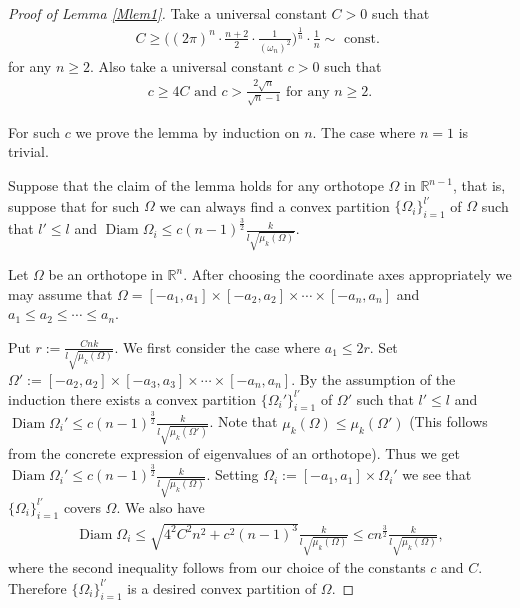 \documentclass[12pt]{amsart}
\theoremstyle{plain}
\theoremstyle{remark}
\newcommand{\diam}{\operatorname{Diam}}
\begin{document}
\begin{proof}[Proof of Lemma \ref{Mlem1}]
    Take a universal constant $C>0$ such that 
    \begin{align*}
         C\geq \Big((2\pi)^n\cdot \frac{n+2}{2} \cdot \frac{1}{(\omega_n)^2}\Big)^{\frac{1}{n}}\cdot \frac{1}{n}\sim \text{ const. }
    \end{align*}for any $n\geq 2$. Also take a universal constant $c>0$ such that
    \begin{align*}
        c\geq 4C \text{ and }c>\frac{2\sqrt{n}}{\sqrt{n}-1} \text{ for any }n\geq 2.
    \end{align*}

    
    For such $c$ we prove the lemma by induction on $n$. The case where $n=1$ is trivial. 

    Suppose that the claim of the lemma holds for any orthotope $\Omega$ in $\mathbb{R}^{n-1}$, that is, suppose that for such $\Omega$ we can always find a convex partition $\{\Omega_i\}_{i=1}^{l'}$ of $\Omega$ such that $l'\leq l$ and $\diam \Omega_i\leq c(n-1)^{\frac{3}{2}}\frac{k}{l\sqrt{\mu_k(\Omega)}}$.

    Let $\Omega$ be an orthotope in $\mathbb{R}^n$. After choosing the coordinate axes appropriately we may assume that $\Omega=[-a_1,a_1]\times [-a_2,a_2]\times \cdots \times [-a_n,a_n]$ and $a_1\leq a_2\leq \cdots \leq a_n$.


    
    Put $r:=\frac{Cnk}{l\sqrt{\mu_k(\Omega)}}$. We first consider the case where $a_1\leq 2r$. Set $\Omega':=[-a_2,a_2]\times [-a_3,a_3]\times \cdots \times [-a_n,a_n]$. By the assumption of the induction there exists a convex partition $\{\Omega_i'\}_{i=1}^{l'}$ of $\Omega'$ such that $l'\leq l$ and $\diam \Omega_i'\leq c(n-1)^{\frac{3}{2}}\frac{k}{l\sqrt{\mu_k(\Omega')}}$. Note that $\mu_k(\Omega)\leq \mu_k(\Omega')$ (This follows from the concrete expression of eigenvalues of an orthotope). Thus we get $\diam \Omega_i'\leq c(n-1)^{\frac{3}{2}}\frac{k}{l\sqrt{\mu_k(\Omega)}}$. Setting $\Omega_i:=[-a_1,a_1]\times \Omega_i'$ we see that $\{\Omega_i\}_{i=1}^{l'}$ covers $\Omega$. We also have 
    \begin{align*}
        \diam \Omega_i\leq \sqrt{4^2C^2n^2+c^2(n-1)^3}\frac{k}{l\sqrt{\mu_k(\Omega)}}\leq cn^{\frac{3}{2}}\frac{k}{l\sqrt{\mu_k(\Omega)}},
    \end{align*}where the second inequality follows from our choice of the constants $c$ and $C$. Therefore $\{\Omega_i\}_{i=1}^{l'}$ is a desired convex partition of $\Omega$.
    


\end{proof}
\end{document}
